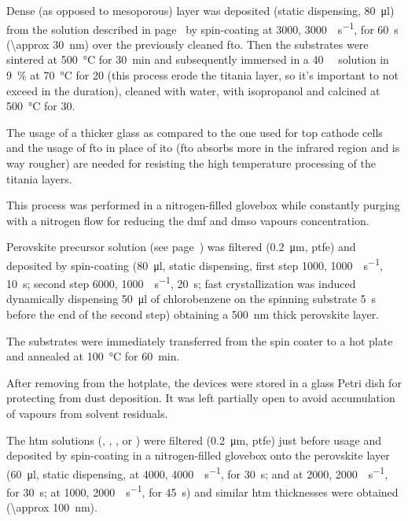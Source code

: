 			Dense (as opposed to mesoporous) \TiOtwo layer was deposited (static dispensing, \SI{80}{\ul}) from the solution described in page~\pageref{precursors_tio2} by spin-coating at \SI{3000}{\rpm}, \SI{3000}{\rpm\per\s}, for \SI{60}{\s} (\SI{\approx 30}{\nm}) over the previously cleaned \gls{fto}. Then
			the substrates were sintered at \SI{500}{\celsius} for \SI{30}{\minute} and subsequently immersed in a \SI{40}{\milli\Molar}
			 solution in 9~\%  at \SI{70}{\celsius} for \SI{20}{\min} (this process erode the titania layer, so it's important to not exceed in the duration), cleaned with water, with isopropanol and	calcined at \SI{500}{\celsius} for \SI{30}{\min}.

			The usage of a thicker glass as compared to the one used for top cathode cells and the usage of \gls{fto} in place of \gls{ito} (\gls{fto} absorbs more in the infrared region and is way rougher) are needed for resisting the high temperature processing of the titania layers.



			This process was performed in a nitrogen-filled glovebox
			while constantly purging with a nitrogen flow for reducing the \gls{dmf} and \gls{dmso} vapours concentration.

			Perovskite precursor solution (see page~\pageref{precursors_csfamapbibr}) was filtered (\SI{0.2}{\um}, \gls{ptfe})
			and deposited by spin-coating (\SI{80}{\ul}, static dispensing, first step \SI{1000}{\rpm}, \SI{1000}{\rpm\per\s}, \SI{10}{\s};
			second step \SI{6000}{\rpm}, \SI{1000}{\rpm\per\s}, \SI{20}{\s}; fast crystallization was induced dynamically
			dispensing \SI{50}{\ul} of chlorobenzene on the spinning substrate \SI{5}{\s} before the end of the second
			step) obtaining a \SI{500}{\nm} thick perovskite layer.

			The substrates were immediately transferred from
			the spin coater to a hot plate and annealed at \SI{100}{\celsius} for \SI{60}{\minute}.

			After removing from the hotplate, the devices were stored in a glass Petri dish for protecting from dust deposition. It was left partially open to avoid accumulation of vapours from solvent residuals.


			The \gls{htm} solutions (\spiro, , , or ) were filtered (\SI{0.2}{\um}, \gls{ptfe}) just before usage and deposited by spin-coating in a nitrogen-filled glovebox
			onto the perovskite layer (\SI{60}{\ul}, static dispensing, \spiro at \SI{4000}{\rpm}, \SI{4000}{\rpm\per\s},
			for \SI{30}{\s};  and  at \SI{2000}{\rpm}, \SI{2000}{\rpm\per\s}, for \SI{30}{\s};  at \SI{1000}{\rpm}, \SI{2000}{\rpm\per\s},
			for \SI{45}{\s}) and similar \gls{htm} thicknesses were obtained (\SI{\approx 100}{\nm}).

